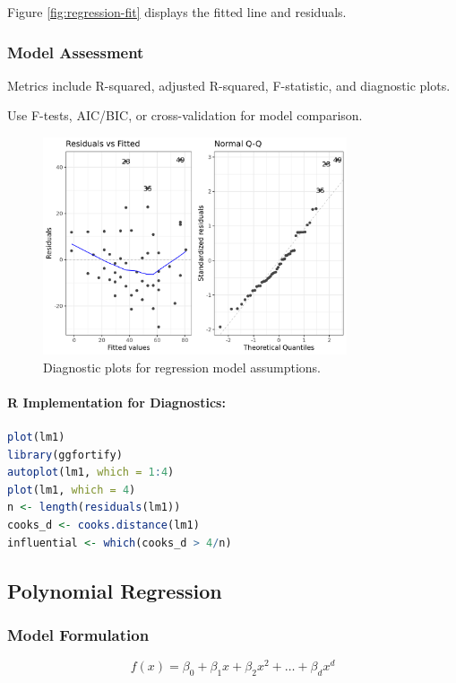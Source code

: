 \documentclass[11pt,a4paper]{article}
\begin{document}
Figure \ref{fig:regression-fit} displays the fitted line and residuals.

\subsubsection{Model Assessment}

Metrics include R-squared, adjusted R-squared, F-statistic, and diagnostic plots.

\begin{tipbox}
Use F-tests, AIC/BIC, or cross-validation for model comparison.
\end{tipbox}

\begin{figure}[htb]
    \centering
    \includegraphics[width=0.8\textwidth]{diagnostic-plots.png}
    \caption{Diagnostic plots for regression model assumptions.}
    \label{fig:diagnostic-plots}
\end{figure}

\paragraph{R Implementation for Diagnostics:}
\begin{lstlisting}[language=R]
plot(lm1)
library(ggfortify)
autoplot(lm1, which = 1:4)
plot(lm1, which = 4)
n <- length(residuals(lm1))
cooks_d <- cooks.distance(lm1)
influential <- which(cooks_d > 4/n)
\end{lstlisting}

\subsection{Polynomial Regression}

\subsubsection{Model Formulation}
\begin{equation}
f(x) = \beta_0 + \beta_1x + \beta_2x^2 + \ldots + \beta_dx^d
\end{equation}
\end{document}
